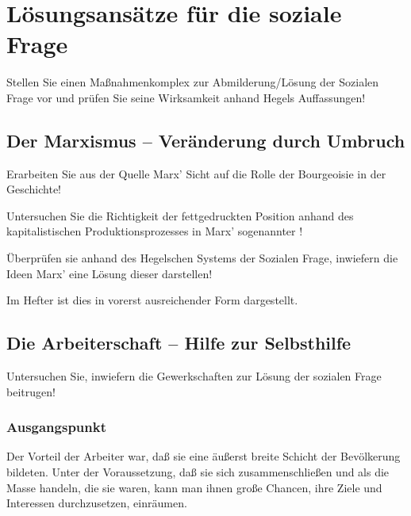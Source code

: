 \section{Lösungsansätze für die soziale Frage}
\label{sec:soz-frag-loes}

\begin{aufgabe}
Stellen Sie einen Maßnahmenkomplex zur Abmilderung/Lösung der Sozialen
Frage vor und prüfen Sie seine Wirksamkeit anhand Hegels Auffassungen! 
\end{aufgabe}

\subsection{Der Marxismus -- Veränderung durch Umbruch}
\label{ssc:marxismus}

\begin{aufgabe}
Erarbeiten Sie aus der Quelle Marx' Sicht auf die Rolle der
Bourgeoisie in der Geschichte!

Untersuchen Sie die Richtigkeit der fettgedruckten Position anhand des
kapitalistischen Produktionsprozesses in Marx' sogenannter ! 

Überprüfen sie anhand des Hegelschen Systems der Sozialen Frage,
inwiefern die Ideen Marx' eine Lösung dieser darstellen!
\end{aufgabe}

Im Hefter ist dies in vorerst ausreichender Form dargestellt.


\subsection{Die Arbeiterschaft -- Hilfe zur Selbsthilfe}
\label{ssc:arb-bew}
\label{ssc:soz-frag-loes-arb}

\begin{aufgabe}
Untersuchen Sie, inwiefern die Gewerkschaften zur Lösung der sozialen
Frage beitrugen!
\end{aufgabe}

\subsubsection{Ausgangspunkt}

Der Vorteil der Arbeiter war, daß sie eine äußerst breite Schicht der
Bevölkerung bildeten. Unter der Voraussetzung, daß sie sich
zusammenschließen und als die Masse handeln, die sie waren, kann man
ihnen große Chancen, ihre Ziele und Interessen durchzusetzen,
einräumen.

